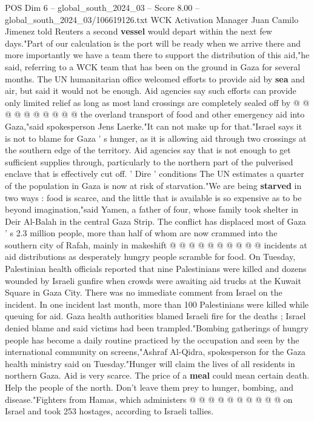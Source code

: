 \begin{textsample}{POS Dim 6 – global\_south\_2024\_03 – Score 8.00 – global\_south\_2024\_03/106619126.txt}
WCK Activation Manager Juan Camilo Jimenez told Reuters a second \textbf{vessel} would depart within the next few days."Part of our calculation is the port will be ready when we arrive there and more importantly we have a team there to support the distribution of this aid,"he said, referring to a WCK team that has been on the ground in Gaza for several months.
The UN humanitarian office welcomed efforts to provide aid by \textbf{sea} and air, but said it would not be enough.
Aid agencies say such efforts can provide only limited relief as long as most land crossings are completely sealed off by @ @ @ @ @ @ @ @ @ @ the overland transport of food and other emergency aid into Gaza,"said spokesperson Jens Laerke."It can not make up for that."Israel says it is not to blame for Gaza ' s hunger, as it is allowing aid through two crossings at the southern edge of the territory.
Aid agencies say that is not enough to get sufficient supplies through, particularly to the northern part of the pulverised enclave that is effectively cut off. ' Dire ' conditions The UN estimates a quarter of the population in Gaza is now at risk of starvation."We are being \textbf{starved} in two ways : food is scarce, and the little that is available is so expensive as to be beyond imagination,"said Yamen, a father of four, whose family took shelter in Deir Al-Balah in the central Gaza Strip.
The conflict has displaced most of Gaza ' s 2.3 million people, more than half of whom are now crammed into the southern city of Rafah, mainly in makeshift @ @ @ @ @ @ @ @ @ @ incidents at aid distributions as desperately hungry people scramble for food.
On Tuesday, Palestinian health officials reported that nine Palestinians were killed and dozens wounded by Israeli gunfire when crowds were awaiting aid trucks at the Kuwait Square in Gaza City.
There was no immediate comment from Israel on the incident.
In one incident last month, more than 100 Palestinians were killed while queuing for aid.
Gaza health authorities blamed Israeli fire for the deaths ; Israel denied blame and said victims had been trampled."Bombing gatherings of hungry people has become a daily routine practiced by the occupation and seen by the international community on screens,"Ashraf Al-Qidra, spokesperson for the Gaza health ministry said on Tuesday."Hunger will claim the lives of all residents in northern Gaza.
Aid is very scarce.
The price of a \textbf{meal} could mean certain death.
Help the people of the north.
Don't leave them prey to hunger, bombing, and disease."Fighters from Hamas, which administers @ @ @ @ @ @ @ @ @ @ on Israel and took 253 hostages, according to Israeli tallies.

\end{textsample}
